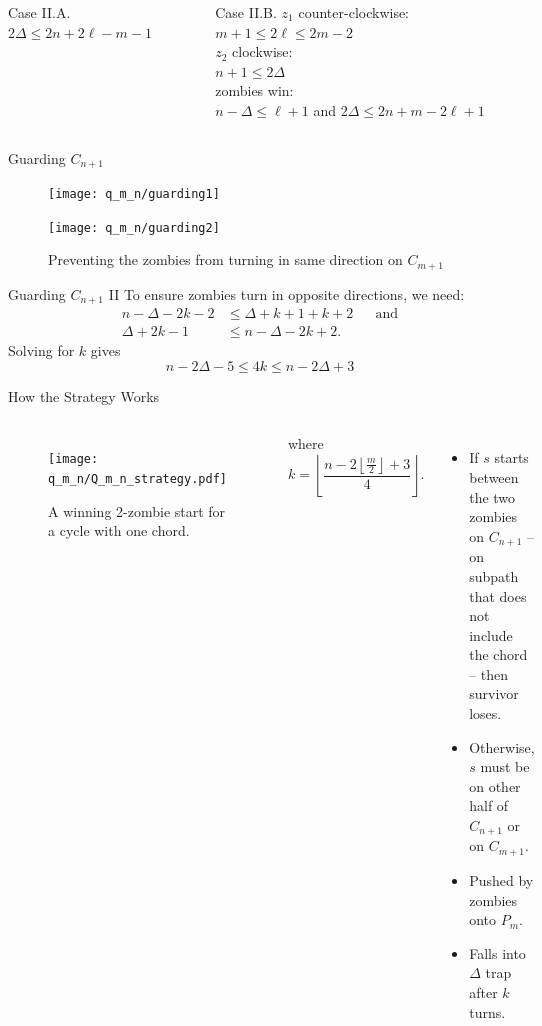 \begin{frame}
\begin{columns}[T]
\begin{block}{Case II.A.}
$2 \Delta \leq 2n + 2\ell - m - 1$ \\
\end{block}
\vfill
\begin{block}{Case II.B.}
$z_1$ counter-clockwise: $ m + 1 \leq 2 \ell \leq 2m - 2$ \\
$z_2$ clockwise: \\
$ n+1 \leq 2 \Delta $ \\
zombies win: \\
$ n - \Delta \leq \ell + 1$ and $2 \Delta \leq 2n + m - 2\ell + 1$ \\
\end{block}
\end{columns}
\end{frame}

\begin{frame}{Guarding $C_{n+1}$}
  \begin{figure}
    \centering
    \texttt{[image: q\_m\_n/guarding1]}

    \vspace{1cm}

    \texttt{[image: q\_m\_n/guarding2]}
    \caption{Preventing the zombies from turning in same direction on $C_{m+1}$\label{fig:guarding}}
  \end{figure}
\end{frame}

\begin{frame}{Guarding $C_{n+1}$ II}
To ensure zombies turn in opposite directions, we need:
  \begin{align*}
   n - \Delta - 2k - 2 &\leq \Delta + k +1 + k +2 && \text{and} \\
   \Delta + 2k -1 &\leq n - \Delta -2k +2 .
  \end{align*}
  Solving for $k$ gives
  \[ n - 2\Delta -5 \leq 4k \leq n - 2\Delta +3 \]
\end{frame}

\begin{frame}{How the Strategy Works}
  \begin{columns}
    \begin{figure}
    \texttt{[image: q\_m\_n/Q\_m\_n\_strategy.pdf]}
    \caption{A winning 2-zombie start for a cycle with one chord.}
    \end{figure}
    where
    \[ k = \left\lfloor \frac{n - 2 \left\lfloor\frac{m}{2}\right\rfloor +3}{4} \right\rfloor. \]

    \begin{itemize}
      \item<1-> If $s$ starts between the two zombies on $C_{n+1}$ -- on subpath that does not include the chord -- then survivor loses.
      \item<2-> Otherwise, $s$ must be on other half of $C_{n+1}$ or on $C_{m+1}$.
      \item<3-> Pushed by zombies onto $P_m$.
      \item<4-> Falls into $\Delta$ trap after $k$ turns.
    \end{itemize}
  \end{columns}
\end{frame}
